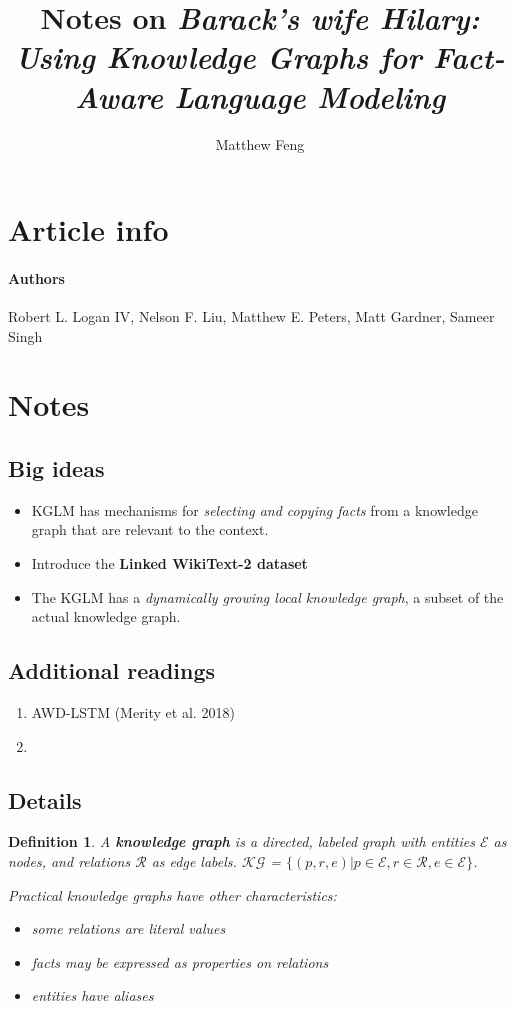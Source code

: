 \documentclass{article}
\title{
  Notes on {\it Barack's wife Hilary: Using Knowledge Graphs for Fact-Aware
  Language Modeling}
}
\author{
  Matthew Feng
}
\newtheorem{definition}{Definition}
\newcommand{\E}{\mathcal{E}}
\newcommand{\KG}{\mathcal{KG}}
\newcommand{\R}{\mathcal{R}}
\begin{document}
\maketitle

\section{Article info}
\paragraph{Authors} Robert L. Logan IV, Nelson F. Liu, Matthew E. Peters,
Matt Gardner, Sameer Singh

\section{Notes}

\subsection{Big ideas}
\begin{itemize}
  \item KGLM has mechanisms for {\it selecting and copying facts} from
    a knowledge graph that are relevant to the context.
  \item Introduce the {\bf Linked WikiText-2 dataset}
  \item The KGLM has a {\it dynamically growing local knowledge graph},
    a subset of the actual knowledge graph.
\end{itemize}

\subsection{Additional readings}
\begin{enumerate}
  \item AWD-LSTM (Merity et al. 2018)
  \item
\end{enumerate}

\subsection{Details}

\begin{definition}
  A {\bf knowledge graph} is a directed, labeled graph with entities
  $\E$ as nodes, and relations $\R$ as edge labels.
  $\KG$ = $\{(p, r, e) | p \in \E, r \in \R, e \in \E\}$.

  Practical knowledge graphs have other characteristics:
  \begin{itemize}
    \item some relations are literal values
    \item facts may be expressed as properties on relations
    \item entities have {\it aliases}
  \end{itemize}
\end{definition}
\end{document}
